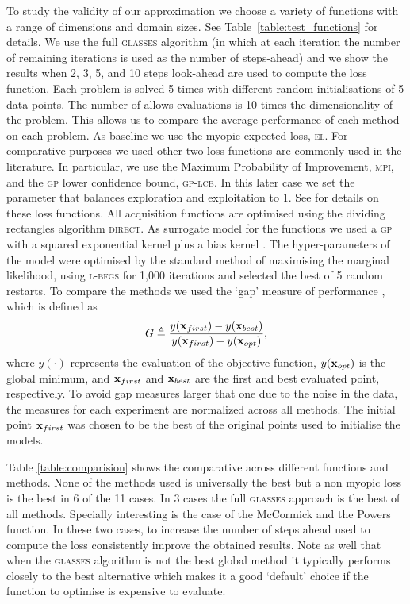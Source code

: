 \documentclass[twoside]{article}
\newcommand{\acr}[1]{\textsc{#1}\xspace}
\newcommand{\gp}{\acr{gp}}
\newcommand{\us}{\acr{glasses}}
\newcommand{\direct}{\acr{direct}}
\newcommand{\lbfgs}{\acr{l-bfgs}}
\newcommand{\mpi}{\acr{mpi}}
\newcommand{\el}{\acr{el}}
\newcommand{\lcb}{\acr{gp-lcb}}
\begin{document}
To study the validity of our approximation we choose a variety of functions with a range of dimensions and domain sizes. See Table~\ref{table:test_functions} for details. We use the full \us algorithm (in which at each iteration the number of remaining iterations is used as the number of steps-ahead) and we show the results when 2, 3, 5, and 10 steps look-ahead are used to compute the loss function. Each problem is solved 5 times with different random initialisations of 5 data points. The number of allows evaluations is 10 times the dimensionality of the problem. This allows us to compare the average performance of each method on each problem. As baseline we use the myopic expected loss, \el. For comparative purposes we used other two loss functions are commonly used in the literature. In particular, we use the Maximum Probability of Improvement, \mpi, and the \gp lower confidence bound, \lcb. In this later case we set the parameter that balances exploration and exploitation to 1. See \citep{Snoek*Larochelle*Adams_2012} for details on these loss functions. All acquisition functions are optimised using the dividing rectangles algorithm \direct \citep{Jones1993}.
 As surrogate model for the functions we used a \gp with a squared exponential kernel plus a bias kernel \citep{Rasmussen:2005:GPM:1162254}. The hyper-parameters of the model were optimised by the standard method of maximising the marginal likelihood, using \lbfgs \citep{Nocedal1980} for 1,000 iterations and selected the best of 5 random restarts.
To compare the methods we used the `gap' measure of performance \citep{Huang:2006}, which is defined as
$$G \triangleq \frac{y(\mathbf{x}_{first})-y(\mathbf{x}_{best})}{y(\mathbf{x}_{first})-y(\mathbf{x}_{opt})},$$
where $y(\cdot)$ represents the evaluation of the objective function, $y(\mathbf{x}_{opt})$ is the global minimum, and $\mathbf{x}_{first}$ and $\mathbf{x}_{best}$ are the first and best evaluated point, respectively. To avoid gap measures larger that one due to the noise in the data, the measures for each experiment are normalized across all methods. The initial point $\mathbf{x}_{first}$ was chosen to be the best of the original points used to initialise the models. 

Table \ref{table:comparision} shows the comparative across different functions and methods. None of the methods used is universally the best but a non myopic loss is the best in 6 of the 11 cases. In 3 cases the full \us approach is the best of all methods. Specially interesting is the case of the McCormick and the Powers function. In these two cases, to increase the number of steps ahead used to compute the loss consistently improve the obtained results. Note as well that when the \us algorithm is not the best global method it typically performs closely to the best alternative which makes it a good `default' choice if the function to optimise is expensive to evaluate.
\end{document}
